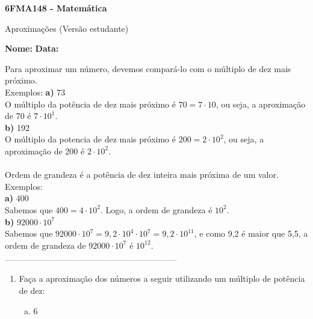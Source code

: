 \documentclass[a4paper,14pt]{article}
\begin{document}
	
	\noindent\textbf{6FMA148 - Matemática} 
	
	\begin{center}Aproximações (Versão estudante)
	\end{center}
	
	\noindent\textbf{Nome:} \underline{\hspace{10cm}}
	\noindent\textbf{Data:} \underline{\hspace{4cm}}
	
	
	\begin{multicols}{2}
	    \noindent Para aproximar um número, devemos compará-lo com o múltiplo de dez mais próximo. \\
	    Exemplos: 
	    \textbf{a)} 73 \\
	    O múltiplo da potência de dez mais próximo é $70 = 7 \cdot 10$, ou seja, a aproximação de 70 é $7 \cdot 10^1$. \\
	    \textbf{b)} 192 \\
	    O múltiplo da potencia de dez mais próximo é $200 = 2 \cdot 10^2$, ou seja, a aproximação de 200 é $2 \cdot 10^2$. \\
	    \\
	    Ordem de grandeza é a potência de dez inteira mais próxima de um valor. \\
	    Exemplos: \\
	    \textbf{a)} 400 \\
	    Sabemos que $400 = 4 \cdot 10^2$. Logo, a ordem de grandeza é $10^2$. \\
	    \textbf{b)} $92 000 \cdot 10^7$ \\
	    Sabemos que $92 000 \cdot 10^7 = 9,2 \cdot 10^4 \cdot 10^7 = 9,2 \cdot 10^11$, e como 9,2 é maior que 5,5, a ordem de grandeza de $92 000 \cdot 10^7$ é $10^{12}$. \\
		\noindent\textsubscript{--------------------------------------------------------------------------}
		\begin{enumerate} 
			\item Faça a aproximação dos números a seguir utilizando um múltiplo de potência de dez:
			\begin{enumerate}[a)]
				\item 6 \\\\\\

\end{enumerate}
\end{enumerate}
\end{multicols}
\end{document}
